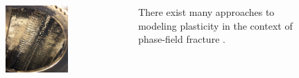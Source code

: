\begin{frame}
\begin{columns}
\begin{column}{0.2\textwidth}
\begin{figure}
\begin{subfigure}{\textwidth}
        \end{subfigure}
        \begin{subfigure}{\textwidth}
          \centering
          \includegraphics[width=\textwidth]{Chapter1/figures/spallation}
        \end{subfigure}
      \end{figure}
    \end{column}
    \begin{column}{0.8\textwidth}
      \vspace{1em}
      
      There exist many approaches to modeling plasticity in the context of phase-field fracture \cite{alessi_gradient_2014, alessi_gradient_2015, alessi_coupling_2018, ambati_phase-field_2015, ambati2016phase, miehe_phase_2016, borden2016phase, borden_phase-field_2017}.
      
      \bigskip
      \pause
      

\end{column}
\end{columns}
\end{frame}
